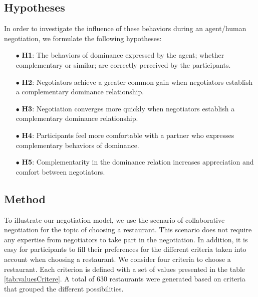 \documentclass[10pt, a4paper, twocolumn]{article} %
\begin{document}
	\subsection{Hypotheses}	
	In order to investigate the influence of these behaviors during an agent/human negotiation, we formulate the following hypotheses: 

	
	\begin{itemize}
		\item [$\bullet$] \textbf{H1}: The behaviors of dominance expressed by the agent; whether complementary or similar; are correctly perceived by the participants.
		\item [$\bullet$] \textbf{H2}: Negotiators achieve a greater common gain when negotiators establish a complementary dominance relationship.
		\item [$\bullet$] \textbf{H3}: Negotiation converges more quickly when negotiators establish a complementary dominance relationship. 
		\item [$\bullet$] \textbf{H4}: Participants feel more comfortable with a partner who expresses complementary behaviors of dominance.
		\item [$\bullet$] \textbf{H5}: Complementarity in the dominance relation increases appreciation and comfort between negotiators.
		
	\end{itemize}

	\subsection{Method}
		\label{sec:methodo}
		
		To illustrate our negotiation model, we use the scenario of collaborative negotiation for the topic of choosing a restaurant.
		This scenario does not require any expertise from negotiators to take part in the negotiation. 
		In addition, it is easy for participants to fill their preferences for the different criteria taken into account when choosing a restaurant.
		We consider four criteria to choose a restaurant. Each criterion is defined with a set of values presented in the table \ref{tab:valuesCritere}. A total of 630 restaurants were generated based on criteria that grouped the different possibilities.
		
\end{document}
